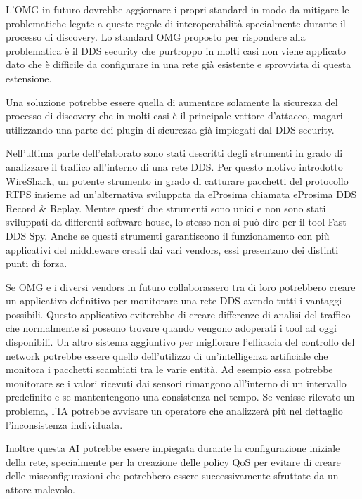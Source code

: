L'OMG in futuro dovrebbe aggiornare i propri standard in modo da 
mitigare le problematiche legate a queste regole di interoperabilità
specialmente durante il 
processo di discovery. Lo standard OMG proposto per rispondere alla problematica
è il DDS security che purtroppo in molti casi 
non viene applicato dato che è difficile da 
configurare in una rete già esistente e sprovvista di questa estensione.

Una soluzione potrebbe essere quella di aumentare solamente 
la sicurezza del 
processo di discovery che in molti casi è il 
principale vettore d'attacco, magari 
utilizzando una parte dei plugin di sicurezza già impiegati dal DDS security.

Nell'ultima parte dell'elaborato sono stati descritti degli strumenti 
in grado di analizzare il traffico all'interno di una rete DDS.
Per questo motivo introdotto WireShark, un potente strumento in grado di 
catturare pacchetti del protocollo RTPS insieme ad un'alternativa
sviluppata da eProsima chiamata eProsima DDS Record \&
Replay. Mentre questi due strumenti sono unici e non sono stati 
sviluppati da differenti software house, lo stesso non 
si può dire per il tool Fast DDS Spy.
Anche se questi strumenti garantiscono il funzionamento 
con più applicativi del middleware creati dai vari vendors, essi
presentano dei distinti punti di forza. 

Se OMG e i diversi vendors in futuro collaborassero tra di loro 
potrebbero creare un applicativo definitivo per monitorare 
una rete DDS avendo tutti i vantaggi possibili. Questo applicativo 
eviterebbe di creare differenze di analisi del
traffico che normalmente 
si possono trovare quando vengono adoperati i tool ad oggi 
disponibili.
Un altro sistema aggiuntivo per migliorare l'efficacia del 
controllo del network potrebbe essere quello 
dell'utilizzo di un'intelligenza artificiale che monitora 
i pacchetti scambiati tra le varie entità. 
Ad esempio essa potrebbe monitorare se i valori ricevuti dai sensori 
rimangono all'interno di un intervallo predefinito e se 
mantentengono una consistenza nel tempo. Se venisse rilevato 
un problema, l'IA potrebbe avvisare un operatore che 
analizzerà più nel dettaglio l'inconsistenza individuata.

Inoltre questa AI potrebbe 
essere impiegata durante la configurazione iniziale della rete,
specialmente per la creazione delle policy QoS per evitare
di creare delle misconfigurazioni che potrebbero essere
successivamente sfruttate da un attore malevolo.

